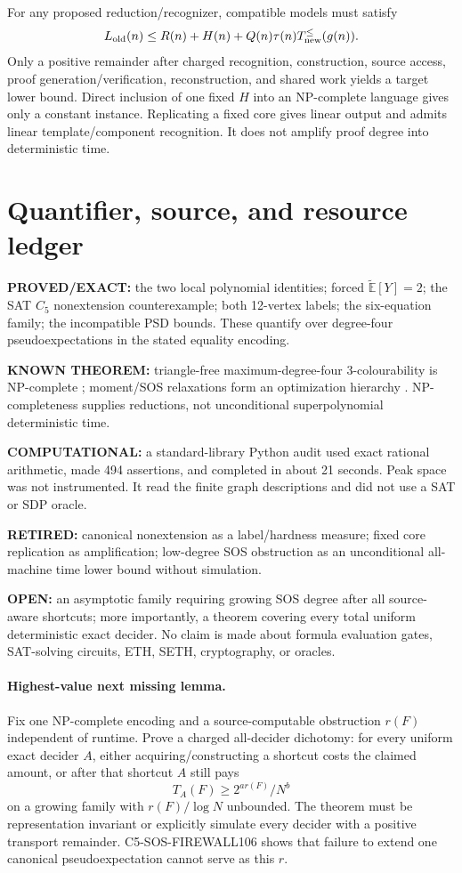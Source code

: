 \documentclass[11pt]{article}
\newcommand{\E}{\widetilde{\mathbb E}}
\begin{document}
For any proposed reduction/recognizer, compatible models must satisfy
\[
L_{\rm old}(n)\le R(n)+H(n)+Q(n)\tau(n)T_{\rm new}^{\le}(g(n)).
\]
Only a positive remainder after charged recognition, construction, source
access, proof generation/verification, reconstruction, and shared work yields
a target lower bound.  Direct inclusion of one fixed $H$ into an NP-complete
language gives only a constant instance.  Replicating a fixed core gives
linear output and admits linear template/component recognition.  It does not
amplify proof degree into deterministic time.

\section{Quantifier, source, and resource ledger}
\textbf{PROVED/EXACT:} the two local polynomial identities; forced
$\E[Y]=2$; the SAT $C_5$ nonextension counterexample; both 12-vertex labels;
the six-equation family; the incompatible PSD bounds.  These quantify over
degree-four pseudoexpectations in the stated equality encoding.

\textbf{KNOWN THEOREM:} triangle-free maximum-degree-four 3-colourability is
NP-complete \cite{MP}; moment/SOS relaxations form an optimization hierarchy
\cite{Lasserre}.  NP-completeness supplies reductions, not unconditional
superpolynomial deterministic time.

\textbf{COMPUTATIONAL:} a standard-library Python audit used exact rational
arithmetic, made 494 assertions, and completed in about 21 seconds.  Peak
space was not instrumented.  It read the finite graph descriptions and did
not use a SAT or SDP oracle.

\textbf{RETIRED:} canonical nonextension as a label/hardness measure; fixed
core replication as amplification; low-degree SOS obstruction as an
unconditional all-machine time lower bound without simulation.

\textbf{OPEN:} an asymptotic family requiring growing SOS degree after all
source-aware shortcuts; more importantly, a theorem covering every total
uniform deterministic exact decider.  No claim is made about formula
evaluation gates, SAT-solving circuits, ETH, SETH, cryptography, or oracles.

\paragraph{Highest-value next missing lemma.}
Fix one NP-complete encoding and a source-computable obstruction $r(F)$
independent of runtime.  Prove a charged all-decider dichotomy: for every
uniform exact decider $A$, either acquiring/constructing a shortcut costs the
claimed amount, or after that shortcut $A$ still pays
\[
T_A(F)\ge 2^{a r(F)}/N^b
\]
on a growing family with $r(F)/\log N$ unbounded.  The theorem must be
representation invariant or explicitly simulate every decider with a
positive transport remainder.  C5-SOS-FIREWALL106 shows that failure to
extend one canonical pseudoexpectation cannot serve as this $r$.
\end{document}
